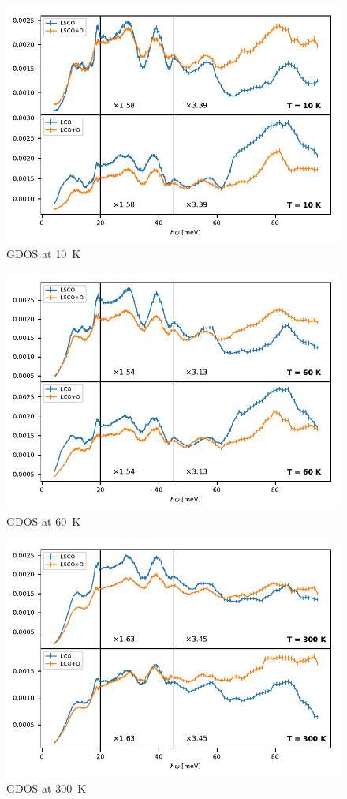 \begin{figure}
    \centering
    \includegraphics[width=\textwidth]{fig/gdos/gdos_10K.pdf}
    \caption[gDOS at \SI{10}{\kelvin}]{GDOS at \SI{10}{\kelvin}}
    \label{fig:gdos_10k}
\end{figure}

\begin{figure}
    \centering
    \includegraphics[width=\textwidth]{fig/gdos/gdos_60K.pdf}
    \caption[gDOS at \SI{60}{\kelvin}]{GDOS at \SI{60}{\kelvin}}
    \label{fig:gdos_60k}
\end{figure}

\begin{figure}
    \centering
    \includegraphics[width=\textwidth]{fig/gdos/gdos_300K.pdf}
    \caption[gDOS at \SI{300}{\kelvin}]{GDOS at \SI{300}{\kelvin}}
    \label{fig:gdos_300k}
\end{figure}